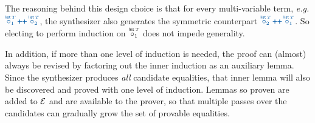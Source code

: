 The reasoning behind this design choice is that for every multi-variable
term, \emph{e.g.} $\clrterm\pholder{1}{\tlist\,T} \concat \pholder{2}{\tlist\,T}$,
the synthesizer also generates the symmetric counterpart
$\clrterm\pholder{2}{\tlist\,T} \concat \pholder{1}{\tlist\,T}$.
So electing to perform induction on $\pholder{1}{\tlist\,T}$ does not impede
generality.

In addition, if more than one level of induction is needed, the proof can
(almost) always be revised by factoring out the inner induction as an auxiliary lemma.
Since the synthesizer produces \emph{all} candidate equalities, that inner
lemma will also be discovered and proved with one level of induction.
Lemmas so proven are added to $\mathcal{E}$ and are available to the prover, so that
multiple passes over the candidates can gradually grow the set of provable equalities.

